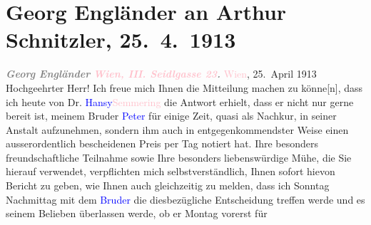 

               \section[Georg Engländer an Arthur Schnitzler, 25. 4. 1913]{ Georg Engländer an Arthur Schnitzler, 25. 4. 1913}\nopagebreak{}\rehead{ }\normalsize\beginnumbering{} \toendnotes[C]{\smallbreak\pagebreak[2]} 
\toendnotes[C]{\smallbreak}\pstart
           \noindent{}{\pb}\textcolor{gray}{\textbf{\textit{Georg Engländer}}}\pend
           \pstart
           \textcolor{gray}{\textbf{\textit{\textcolor{pink}{Wien, III. Seidlgasse
                            23}{}\ledrightnote{\textcolor{pink}{Seidlgasse}}.}}}\pend
           \pstart
           \raggedleft{}\textcolor{pink}{Wien}{}\ledrightnote{\textcolor{pink}{Wien}},
                            25. April 1913\pend
           \pstart{}Hochgeehrter Herr!\pend\pstart
           Ich freue mich Ihnen die Mitteilung machen zu könne{[}n{]}, dass
                    ich heute von Dr. \textcolor{blue}{Hansy}{}\ledrightnote{\textcolor{blue}{Franz Hansy}}{ }\textcolor{pink}{Semmering}{}\ledrightnote{\textcolor{pink}{Semmering}} die Antwort
                    erhielt, dass er nicht nur gerne bereit ist, meinem Bruder \textcolor{blue}{Peter}{}\ledrightnote{\textcolor{blue}{Peter Altenberg}} für einige Zeit, quasi als Nachkur, in seiner Anstalt
                    aufzunehmen, sondern ihm auch in entgegenkommendster Weise einen
                    ausserordentlich bescheidenen Preis per Tag notiert hat.\pend
           \pstart
           Ihre besonders freundschaftliche Teilnahme sowie Ihre besonders liebenswürdige
                    Mühe, die Sie hierauf verwendet, verpflichten mich selbstverständlich, Ihnen
                    sofort hievon Bericht zu geben, wie Ihnen auch gleichzeitig zu melden, dass ich
                        Sonntag{ }{\pb}Nachmittag mit dem \textcolor{blue}{Bruder}{} die diesbezügliche Entscheidung treffen werde
                    und es seinem Belieben überlassen werde, ob er Montag vorerst für
